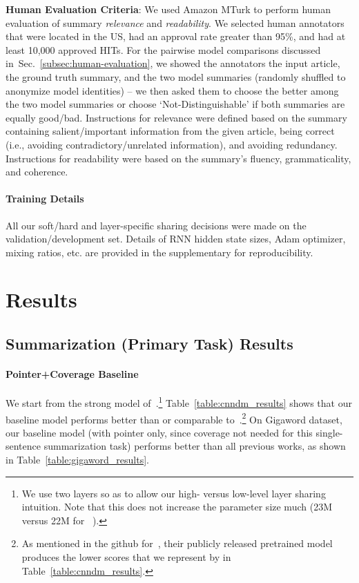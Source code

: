 \documentclass[11pt,a4paper]{article}
\def\secref#1{Sec.~\ref{#1}}
\begin{document}
\noindent\textbf{Human Evaluation Criteria}: We used Amazon MTurk to perform human evaluation of summary \emph{relevance} and \emph{readability}. We selected human annotators that were located in the US, had an approval rate greater than 95\%, and had at least 10,000 approved HITs. For the pairwise model comparisons discussed in~\secref{subsec:human-evaluation}, we showed the annotators the input article, the ground truth summary, and the two model summaries (randomly shuffled to anonymize model identities) -- we then asked them to choose the better among the two model summaries or choose `Not-Distinguishable' if both summaries are equally good/bad.
Instructions for relevance were defined based on the summary containing salient/important information from the given article, being correct (i.e., avoiding contradictory/unrelated information), and avoiding redundancy.
Instructions for readability were based on the summary's fluency, grammaticality, and coherence. 


\paragraph{Training Details}
\label{subsec:training-details}
All our soft/hard and layer-specific sharing decisions were made on the validation/development set. Details of RNN hidden state sizes, Adam optimizer, mixing ratios, etc. are provided in the supplementary for reproducibility.

 
\section{Results}
\label{sec-results}

\subsection{Summarization (Primary Task) Results}

\paragraph{Pointer+Coverage Baseline}
We start from the strong model of~.\footnote{We use two layers so as to allow our high- versus low-level layer sharing intuition. Note that this does not increase the parameter size much (23M versus 22M for ~).} Table~\ref{table:cnndm_results} shows that our baseline model performs better than or comparable to~.\footnote{As mentioned in the github for~, their publicly released pretrained model produces the lower scores that we represent by  in Table~\ref{table:cnndm_results}.} 
On Gigaword dataset, our baseline model (with pointer only, since coverage not needed for this single-sentence summarization task) performs better than all previous works, as shown in Table~\ref{table:gigaword_results}. 
\end{document}
